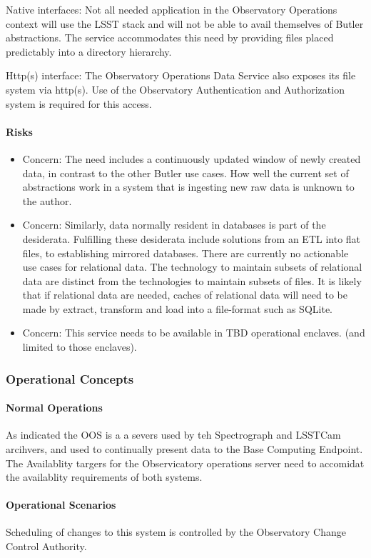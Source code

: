 Native interfaces: Not all needed application in the Observatory Operations context
will use the LSST stack and will not be able to avail themselves of Butler abstractions.
The service accommodates this need by providing files placed predictably into a
directory hierarchy.

Http(s) interface: The Observatory Operations Data Service also exposes its
file system via http(s). Use of the Observatory Authentication and Authorization
system is required for this access.

\paragraph{Risks}

\begin{itemize}

\item Concern: The need includes a continuously updated window of newly created
data, in contrast to the other Butler use cases.  How well the current set of
abstractions work in a system that is ingesting new raw data  is unknown to the
author.

\item Concern: Similarly, data normally resident in databases is part of the desiderata.
Fulfilling these desiderata include solutions from an ETL into flat files, to
establishing mirrored databases. There are currently no actionable use cases
for relational data. The technology to maintain subsets of relational data are distinct
from the technologies to maintain subsets of files. It is likely that if relational data are
needed, caches of relational data will need to be made by extract, transform and load
into a file-format such as SQLite.

\item Concern: This service needs to be available in TBD operational enclaves. (and limited to those enclaves).

\end{itemize}

\subsubsection{Operational Concepts}

\paragraph{Normal Operations}

As indicated the OOS is a a severs used by teh Spectrograph and LSSTCam arcihvers, and used
to continually present data to the Base Computing Endpoint. The Availablity targers for the
Observicatory operations server need to accomidat the availablity requirements of both systems.

\paragraph{Operational Scenarios}

Scheduling of changes to this system is controlled by the Observatory Change Control Authority.
